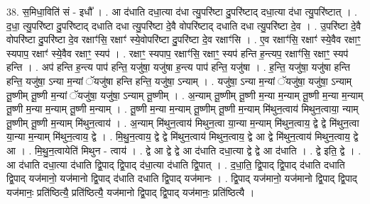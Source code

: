 \documentclass[17pt]{extarticle}
\begin{document}
38. स॒मिधा॒विति॑ सं - इधौ᳚ । . आ द॑धाति दधा॒त्या द॑धा त्यु॒परि॑ष्टा दु॒परि॑ष्टाद् दधा॒त्या द॑धा त्यु॒परि॑ष्टात् । . द॒धा॒ त्यु॒परि॑ष्टा दु॒परि॑ष्टाद् दधाति दधा त्यु॒परि॑ष्टा दे॒वै वोपरि॑ष्टाद् दधाति दधा त्यु॒परि॑ष्टा दे॒व । . उ॒परि॑ष्टा दे॒वै वोपरि॑ष्टा दु॒परि॑ष्टा दे॒व रक्षाꣳ॑सि॒ रक्षाꣳ॑ स्ये॒वोपरि॑ष्टा दु॒परि॑ष्टा दे॒व रक्षाꣳ॑सि । . ए॒व रक्षाꣳ॑सि॒ रक्षाꣳ॑ स्ये॒वैव रक्षाꣳ॒॒ स्यपाप॒ रक्षाꣳ॑ स्ये॒वैव रक्षाꣳ॒॒ स्यप॑ । . रक्षाꣳ॒॒ स्यपाप॒ रक्षाꣳ॑सि॒ रक्षाꣳ॒॒ स्यप॑ हन्ति ह॒न्त्यप॒ रक्षाꣳ॑सि॒ रक्षाꣳ॒॒ स्यप॑ हन्ति । . अप॑ हन्ति ह॒न्त्य पाप॑ हन्ति॒ यजु॑षा॒ यजु॑षा ह॒न्त्य पाप॑ हन्ति॒ यजु॑षा । . ह॒न्ति॒ यजु॑षा॒ यजु॑षा हन्ति हन्ति॒ यजु॑षा॒ ऽन्या म॒न्यां ॅयजु॑षा हन्ति हन्ति॒ यजु॑षा॒ ऽन्याम् । . यजु॑षा॒ ऽन्या म॒न्यां ॅयजु॑षा॒ यजु॑षा॒ ऽन्याम् तू॒ष्णीम् तू॒ष्णी म॒न्यां ॅयजु॑षा॒ यजु॑षा॒ ऽन्याम् तू॒ष्णीम् । . अ॒न्याम् तू॒ष्णीम् तू॒ष्णी म॒न्या म॒न्याम् तू॒ष्णी म॒न्या म॒न्याम् तू॒ष्णी म॒न्या म॒न्याम् तू॒ष्णी म॒न्याम् । . तू॒ष्णी म॒न्या म॒न्याम् तू॒ष्णीम् तू॒ष्णी म॒न्याम् मि॑थुन॒त्वाय॑ मिथुन॒त्वाया॒ न्याम् तू॒ष्णीम् तू॒ष्णी म॒न्याम् मि॑थुन॒त्वाय॑ । . अ॒न्याम् मि॑थुन॒त्वाय॑ मिथुन॒त्वा या॒न्या म॒न्याम् मि॑थुन॒त्वाय॒ द्वे द्वे मि॑थुन॒त्वा या॒न्या म॒न्याम् मि॑थुन॒त्वाय॒ द्वे । . मि॒थु॒न॒त्वाय॒ द्वे द्वे मि॑थुन॒त्वाय॑ मिथुन॒त्वाय॒ द्वे आ द्वे मि॑थुन॒त्वाय॑ मिथुन॒त्वाय॒ द्वे आ । . मि॒थु॒न॒त्वायेति॑ मिथुन - त्वाय॑ । . द्वे आ द्वे द्वे आ द॑धाति दधा॒त्या द्वे द्वे आ द॑धाति । . द्वे इति॒ द्वे । . आ द॑धाति दधा॒त्या द॑धाति द्वि॒पाद् द्वि॒पाद् द॑धा॒त्या द॑धाति द्वि॒पात् । . द॒धा॒ति॒ द्वि॒पाद् द्वि॒पाद् द॑धाति दधाति द्वि॒पाद् यज॑मानो॒ यज॑मानो द्वि॒पाद् द॑धाति दधाति द्वि॒पाद् यज॑मानः । . द्वि॒पाद् यज॑मानो॒ यज॑मानो द्वि॒पाद् द्वि॒पाद् यज॑मानः॒ प्रति॑ष्ठित्यै॒ प्रति॑ष्ठित्यै॒ यज॑मानो द्वि॒पाद् द्वि॒पाद् यज॑मानः॒ प्रति॑ष्ठित्यै । \newline
\end{document}

